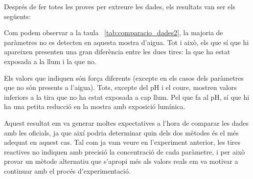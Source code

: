 Després de fer totes les proves per extreure les dades, els resultats van ser els següents:
\begin{table}[H]
\centering
{}
\caption{Resultats del experiment 2}

\label{tab:comparacio_dades2}
\end{table}

Com podem observar a la taula~ \ref{tab:comparacio_dades2}, la majoria de paràmetres no es detecten en aquesta mostra d’aigua. Tot i això, els que sí que hi apareixen presenten una gran diferència entre les dues tires: la que ha estat exposada a la llum i la que no.

Els valors que indiquen són força diferents (excepte en els casos dels paràmetres que no són presents a l’aigua). Tots, excepte del pH i el coure, mostren valors inferiors a la tira que no ha estat exposada a cap llum. Pel que fa al pH, sí que hi ha una petita reducció en la mostra amb exposició lumínica.

Aquest resultat em va generar moltes expectatives a l’hora de comparar les dades amb les oficials, ja que així podria determinar quin dels dos mètodes és el més adequat en aquest cas. Tal com ja vam veure en l’experiment anterior, les tires reactives no indiquen amb precisió la concentració de cada paràmetre, i per això provar un mètode alternatiu que s’apropi més als valors reals em va motivar a continuar amb el procés d’experimentació.

